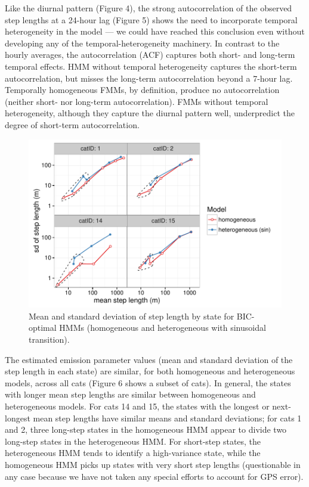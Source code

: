 \documentclass{bmcart}
\begin{document}
Like the diurnal pattern (Figure 4),
the strong autocorrelation of the observed step lengths at a 24-hour lag (Figure 5) shows the need to incorporate temporal heterogeneity in the model --- we could have reached this conclusion even without developing any of the temporal-heterogeneity machinery.
In contrast to the hourly averages, the autocorrelation (ACF) captures both short- and long-term temporal effects. HMM without temporal heterogeneity captures the short-term autocorrelation, but misses the long-term autocorrelation beyond a 7-hour lag.
Temporally homogeneous FMMs, by definition, produce no autocorrelation (neither short- nor long-term autocorrelation). FMMs without temporal heterogeneity, although they capture the diurnal pattern well, underpredict the degree of short-term autocorrelation.

\begin{figure}[h!]
   \includegraphics[width=5in]{figure/r_msdlist-1}
  \caption{ Mean and standard deviation of  step length by state for BIC-optimal HMMs (homogeneous and heterogeneous with sinusoidal transition).
  }
      \end{figure}

The estimated emission parameter values
(mean and standard deviation of the step length in each state)
are similar, for both homogeneous and heterogeneous
models, across all cats (Figure 6 shows a subset of cats). 
In general, the states with longer mean step lengths are
similar between homogeneous and heterogeneous models. For cats 14 and 15, the states with
the longest or next-longest mean step lengths have similar means
and standard deviations; for cats 1 and 2, three long-step states
in the homogeneous HMM appear to divide two long-step states in 
the heterogeneous HMM. For short-step states, the heterogeneous HMM
tends to identify a high-variance state, while the homogeneous HMM
picks up states with very short step lengths (questionable in any
case because we have not taken any special efforts to account for
GPS error).
\end{document}
